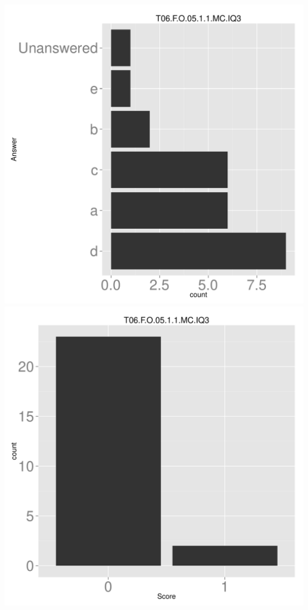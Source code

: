 \documentclass[12pt,nohyper]{tufte-handout}\usepackage[]{graphicx}\usepackage[]{color}
\begin{document}
\begin{center} \includegraphics[width=.45\linewidth]{Topic06_57_answer} \includegraphics[width=.45\linewidth]{Topic06_57_score} \end{center} 
\end{document}
